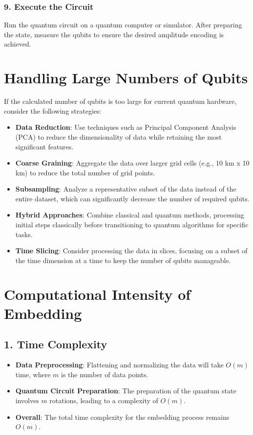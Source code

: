 \documentclass{article}
\begin{document}
\subsubsection{9. Execute the Circuit}
Run the quantum circuit on a quantum computer or simulator. After preparing the state, measure the qubits to ensure the desired amplitude encoding is achieved.

\section{Handling Large Numbers of Qubits}

If the calculated number of qubits is too large for current quantum hardware, consider the following strategies:

\begin{itemize}
    \item \textbf{Data Reduction}: Use techniques such as Principal Component Analysis (PCA) to reduce the dimensionality of data while retaining the most significant features.
    \item \textbf{Coarse Graining}: Aggregate the data over larger grid cells (e.g., 10 km x 10 km) to reduce the total number of grid points.
    \item \textbf{Subsampling}: Analyze a representative subset of the data instead of the entire dataset, which can significantly decrease the number of required qubits.
    \item \textbf{Hybrid Approaches}: Combine classical and quantum methods, processing initial steps classically before transitioning to quantum algorithms for specific tasks.
    \item \textbf{Time Slicing}: Consider processing the data in slices, focusing on a subset of the time dimension at a time to keep the number of qubits manageable.
\end{itemize}

\section{Computational Intensity of Embedding}

\subsection{1. Time Complexity}
\begin{itemize}
    \item \textbf{Data Preprocessing}: Flattening and normalizing the data will take \( O(m) \) time, where \( m \) is the number of data points.
    \item \textbf{Quantum Circuit Preparation}: The preparation of the quantum state involves \( m \) rotations, leading to a complexity of \( O(m) \).
    \item \textbf{Overall}: The total time complexity for the embedding process remains \( O(m) \).
\end{itemize}
\end{document}
